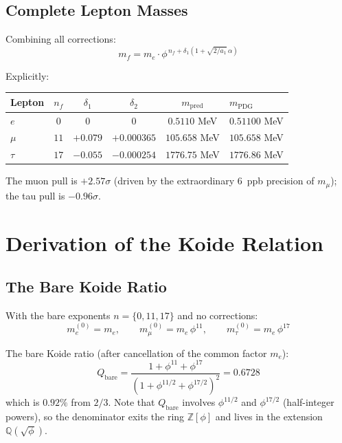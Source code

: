 \documentclass[12pt,a4paper]{article}
\theoremstyle{definition}
\begin{document}
\subsection{Complete Lepton Masses}

Combining all corrections:
\begin{equation}
m_f = m_e \cdot \phi^{\,n_f + \delta_1(1 + \sqrt{2/a_1}\,\alpha)}
\label{eq:full_mass}
\end{equation}

Explicitly:
\begin{center}
\begin{tabular}{lccccl}
\toprule
\textbf{Lepton} & $n_f$ & $\delta_1$ & $\delta_2$ & $m_{\mathrm{pred}}$ & $m_{\mathrm{PDG}}$ \\
\midrule
$e$   & $0$  & $0$      & $0$      & $0.5110$ MeV  & $0.51100$ MeV \\
$\mu$ & $11$ & $+0.079$ & $+0.000365$ & $105.658$ MeV & $105.658$ MeV \\
$\tau$& $17$ & $-0.055$ & $-0.000254$ & $1776.75$ MeV & $1776.86$ MeV \\
\bottomrule
\end{tabular}
\end{center}

The muon pull is $+2.57\sigma$ (driven by the extraordinary $6$~ppb precision of $m_\mu$); the tau pull is $-0.96\sigma$.

\section{Derivation of the Koide Relation}
\label{sec:koide_derivation}

\subsection{The Bare Koide Ratio}

With the bare exponents $n = \{0, 11, 17\}$ and no corrections:
\begin{equation}
m_e^{(0)} = m_e, \qquad m_\mu^{(0)} = m_e\,\phi^{11}, \qquad m_\tau^{(0)} = m_e\,\phi^{17}
\end{equation}

The bare Koide ratio (after cancellation of the common factor $m_e$):
\begin{equation}
Q_{\mathrm{bare}} = \frac{1 + \phi^{11} + \phi^{17}}{(1 + \phi^{11/2} + \phi^{17/2})^2} = 0.6728
\label{eq:Q_bare}
\end{equation}
which is $0.92\%$ from $2/3$.  Note that $Q_{\mathrm{bare}}$ involves $\phi^{11/2}$ and $\phi^{17/2}$ (half-integer powers), so the denominator exits the ring $\mathbb{Z}[\phi]$ and lives in the extension $\mathbb{Q}(\sqrt{\phi})$.
\end{document}
